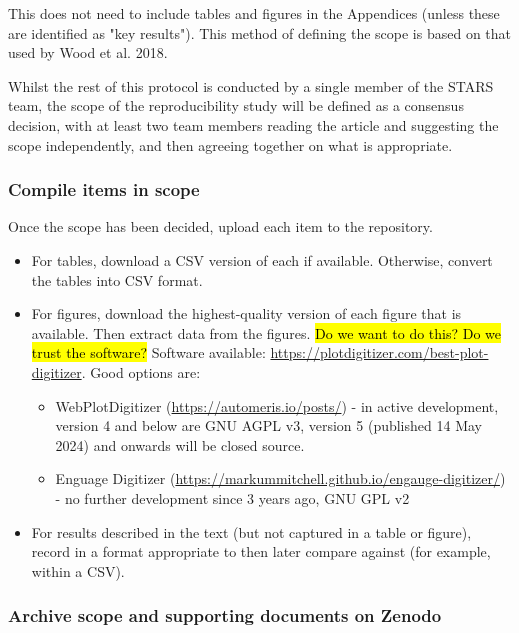 This does not need to include tables and figures in the Appendices (unless these are identified as "key results"). This method of defining the scope is based on that used by Wood et al. 2018.\autocite{wood_replication_2018, wood_push_2018}

Whilst the rest of this protocol is conducted by a single member of the STARS team, the scope of the reproducibility study will be defined as a consensus decision, with at least two team members reading the article and suggesting the scope independently, and then agreeing together on what is appropriate.

\subsubsection{Compile items in scope}
\timeyes

Once the scope has been decided, upload each item to the repository.

\begin{itemize}
    \item For tables, download a CSV version of each if available. Otherwise, convert the tables into CSV format.
    \item For figures, download the highest-quality version of each figure that is available. Then extract data from the figures. \hl{Do we want to do this? Do we trust the software?} Software available: \url{https://plotdigitizer.com/best-plot-digitizer}. Good options are:
    \begin{itemize}
        \item WebPlotDigitizer (\url{https://automeris.io/posts/}) - in active development, version 4 and below are GNU AGPL v3, version 5 (published 14 May 2024) and onwards will be closed source.
        \item Enguage Digitizer (\url{https://markummitchell.github.io/engauge-digitizer/}) - no further development since 3 years ago, GNU GPL v2
    \end{itemize}
    \item For results described in the text (but not captured in a table or figure), record in a format appropriate to then later compare against (for example, within a CSV).
\end{itemize}

\subsubsection{Archive scope and supporting documents on Zenodo}
\timeyes

